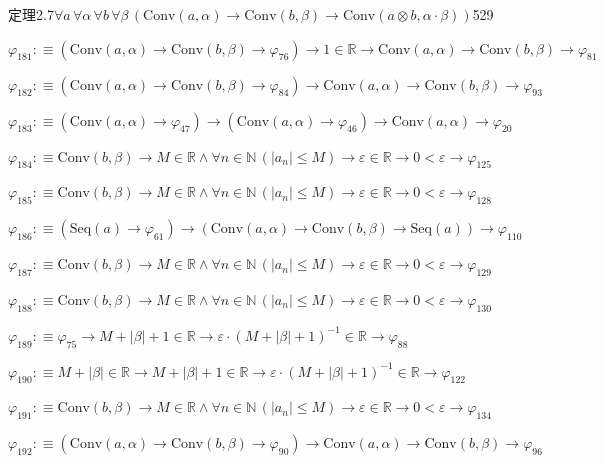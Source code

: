 \begin{fullproof}{定理2.7}{$\forall a\,\forall \alpha\,\forall b\,\forall \beta\,(\mathrm{Conv}(a,\alpha) \to \mathrm{Conv}(b,\beta) \to \mathrm{Conv}(a \otimes b,\alpha \cdot \beta))$}{529}
\begin{abbrevlist}
\item $\varphi_{181} :\equiv (\mathrm{Conv}(a,\alpha) \to \mathrm{Conv}(b,\beta) \to \varphi_{76}) \to 1 \in \mathbb{R} \to \mathrm{Conv}(a,\alpha) \to \mathrm{Conv}(b,\beta) \to \varphi_{81}$
\item $\varphi_{182} :\equiv (\mathrm{Conv}(a,\alpha) \to \mathrm{Conv}(b,\beta) \to \varphi_{84}) \to \mathrm{Conv}(a,\alpha) \to \mathrm{Conv}(b,\beta) \to \varphi_{93}$
\item $\varphi_{183} :\equiv (\mathrm{Conv}(a,\alpha) \to \varphi_{47}) \to (\mathrm{Conv}(a,\alpha) \to \varphi_{46}) \to \mathrm{Conv}(a,\alpha) \to \varphi_{20}$
\item $\varphi_{184} :\equiv \mathrm{Conv}(b,\beta) \to M \in \mathbb{R} \land \forall n \in \mathbb{N}\,(\lvert a_{n} \rvert \leq M) \to \varepsilon \in \mathbb{R} \to 0 < \varepsilon \to \varphi_{125}$
\item $\varphi_{185} :\equiv \mathrm{Conv}(b,\beta) \to M \in \mathbb{R} \land \forall n \in \mathbb{N}\,(\lvert a_{n} \rvert \leq M) \to \varepsilon \in \mathbb{R} \to 0 < \varepsilon \to \varphi_{128}$
\item $\varphi_{186} :\equiv (\mathrm{Seq}(a) \to \varphi_{61}) \to (\mathrm{Conv}(a,\alpha) \to \mathrm{Conv}(b,\beta) \to \mathrm{Seq}(a)) \to \varphi_{110}$
\item $\varphi_{187} :\equiv \mathrm{Conv}(b,\beta) \to M \in \mathbb{R} \land \forall n \in \mathbb{N}\,(\lvert a_{n} \rvert \leq M) \to \varepsilon \in \mathbb{R} \to 0 < \varepsilon \to \varphi_{129}$
\item $\varphi_{188} :\equiv \mathrm{Conv}(b,\beta) \to M \in \mathbb{R} \land \forall n \in \mathbb{N}\,(\lvert a_{n} \rvert \leq M) \to \varepsilon \in \mathbb{R} \to 0 < \varepsilon \to \varphi_{130}$
\item $\varphi_{189} :\equiv \varphi_{75} \to M + \lvert \beta \rvert + 1 \in \mathbb{R} \to \varepsilon \cdot (M + \lvert \beta \rvert + 1)^{-1} \in \mathbb{R} \to \varphi_{88}$
\item $\varphi_{190} :\equiv M + \lvert \beta \rvert \in \mathbb{R} \to M + \lvert \beta \rvert + 1 \in \mathbb{R} \to \varepsilon \cdot (M + \lvert \beta \rvert + 1)^{-1} \in \mathbb{R} \to \varphi_{122}$
\item $\varphi_{191} :\equiv \mathrm{Conv}(b,\beta) \to M \in \mathbb{R} \land \forall n \in \mathbb{N}\,(\lvert a_{n} \rvert \leq M) \to \varepsilon \in \mathbb{R} \to 0 < \varepsilon \to \varphi_{134}$
\item $\varphi_{192} :\equiv (\mathrm{Conv}(a,\alpha) \to \mathrm{Conv}(b,\beta) \to \varphi_{90}) \to \mathrm{Conv}(a,\alpha) \to \mathrm{Conv}(b,\beta) \to \varphi_{96}$

\end{abbrevlist}
\end{fullproof}

